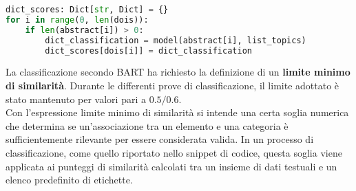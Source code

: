 \begin{lstlisting}[language=python, caption=Classificazione dei dati mediante BART]
dict_scores: Dict[str, Dict] = {}
for i in range(0, len(dois)):
    if len(abstract[i]) > 0:
        dict_classification = model(abstract[i], list_topics)
        dict_scores[dois[i]] = dict_classification
\end{lstlisting}
La classificazione secondo BART ha richiesto la definizione di un \textbf{limite minimo di similarità}. Durante le differenti prove di classificazione, il limite adottato è stato mantenuto per valori pari a $0.5/0.6$. \vspace{7pt} \\
Con l'espressione limite minimo di similarità si intende una certa soglia numerica che determina se un'associazione tra un elemento e una categoria è sufficientemente rilevante per essere considerata valida. In un processo di classificazione, come quello riportato nello snippet di codice, questa soglia viene applicata ai punteggi di similarità calcolati tra un insieme di dati testuali e un elenco predefinito di etichette.